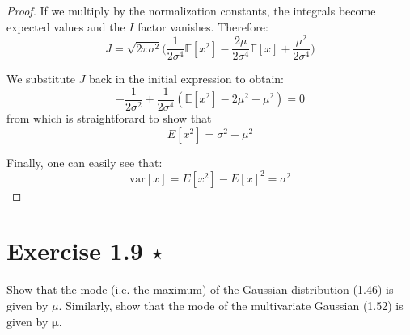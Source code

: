 \begin{proof}
    If we multiply by the normalization constants, the integrals become expected values and the
    $I$ factor vanishes. Therefore:
    \[
        J = \sqrt{2\pi \sigma^2} \bigg(\frac{1}{2\sigma^4} \mathbb{E}[x^2] - \frac{2\mu}{2\sigma^4} \mathbb{E}[x] + \frac{\mu^2}{2\sigma^4}\bigg)
    \] 

    We substitute $J$ back in the initial expression to obtain:
    \[
        -\frac{1}{2\sigma^2} + \frac{1}{2\sigma^4}(\mathbb{E}[x^2] - 2\mu^2 + \mu^2) = 0
    \] 
    from which is straightforard to show that 
    \begin{equation}\label{eq:1.50}\tag{1.50}
        E[x^2] = \sigma^2 + \mu^2
    \end{equation}

    Finally, one can easily see that:
    \begin{equation}\label{eq:1.51}\tag{1.51}
        \text{var}[x] = E[x^2] - E[x]^2 = \sigma^2
    \end{equation}
\end{proof}

\section*{Exercise 1.9 $\star$}
Show that the mode (i.e. the maximum) of the Gaussian distribution (1.46) is
given by $\mu$. Similarly, show that the mode of the multivariate Gaussian
(1.52) is given by $\bm{\mu}$. 

\vspace{1em}


